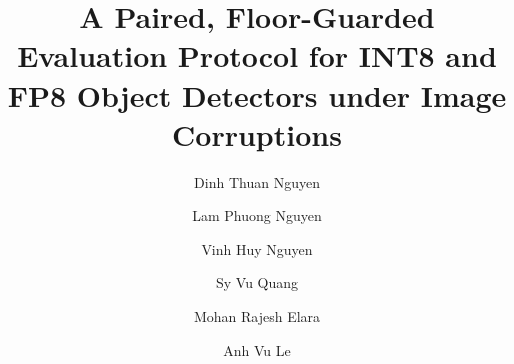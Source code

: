 \documentclass[a4paper,fleqn]{cas-dc}
\def\corref#1{}%
\def\orcidlink#1{}%
\begin{document}
\begin{titlepage}

\title[mode=title]{A Paired, Floor-Guarded Evaluation Protocol for INT8 and FP8 Object Detectors under Image Corruptions}
\author[mymainaddress]{Dinh Thuan Nguyen\orcidlink{0009-0008-6467-203X}}
\author[mymainaddress]{Lam Phuong Nguyen\orcidlink{0009-0007-3439-5871}}
\author[mysecondaryaddress]{Vinh Huy Nguyen\orcidlink{0009-0006-0878-9714}}
\author[mythirthaddress]{Sy Vu Quang}
\author[fourthaddress]{Mohan Rajesh Elara\orcidlink{0000-0001-6504-1530}}
\author[mythirthaddress]{Anh Vu Le\orcidlink{0000-0002-4804-7540}\corref{mycorrespondingauthor}}

\address[mymainaddress]{Faculty of Electrical and Electronics Engineering, Ton Duc Thang University, Ho Chi Minh City, Vietnam}
\address[mysecondaryaddress]{Center of Visualization and Simulation, Duy Tan University, Da Nang, Vietnam}
\address[mythirthaddress]{Advanced Intelligent Technology Research Group, Faculty of Electrical and Electronics Engineering, Ton Duc Thang University, 19 Nguyen Huu Tho Street, Tan Phong Ward, District 7, Ho Chi Minh City 700000, Vietnam}
\address[fourthaddress]{ROAR Lab, Engineering Product Development, Singapore University of Technology and Design, Singapore}


\end{titlepage}
\end{document}
